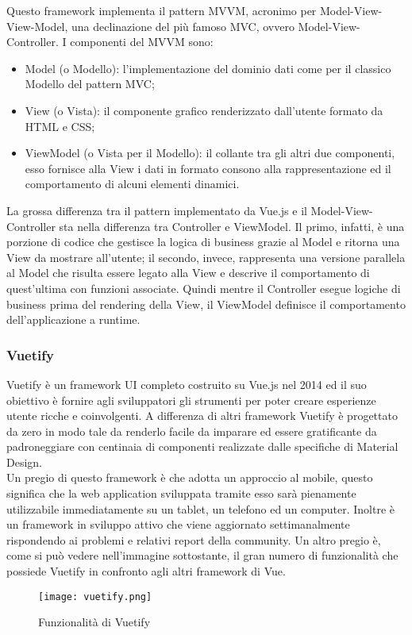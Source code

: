Questo framework implementa il pattern MVVM, acronimo per Model-View-View-Model, una declinazione del più famoso MVC, ovvero Model-View-Controller. I componenti del MVVM sono:
\begin{itemize}
	\item Model (o Modello): l'implementazione del dominio dati come per il classico Modello del pattern MVC;
	\item View (o Vista): il componente grafico renderizzato dall'utente formato da HTML e CSS;
	\item ViewModel (o Vista per il Modello): il collante tra gli altri due componenti, esso fornisce alla View i dati in formato consono alla rappresentazione ed il comportamento di alcuni elementi dinamici.
\end{itemize}
La grossa differenza tra il pattern implementato da Vue.js e il Model-View-Controller sta nella differenza tra Controller e ViewModel. Il primo, infatti, è una porzione di codice che gestisce la logica di business grazie al Model e ritorna una View da mostrare all'utente; il secondo, invece, rappresenta una versione parallela al Model che risulta essere legato alla View e descrive il comportamento di quest'ultima con funzioni associate. Quindi mentre il Controller esegue logiche di business prima del rendering della View, il ViewModel definisce il comportamento dell'applicazione a runtime.

\subsubsection{Vuetify}
Vuetify è un framework UI completo costruito su Vue.js nel 2014 ed il suo obiettivo è fornire agli sviluppatori gli strumenti per poter creare esperienze utente ricche e coinvolgenti. A differenza di altri framework Vuetify è progettato da zero in modo tale da renderlo facile da imparare ed essere gratificante da padroneggiare con centinaia di componenti realizzate dalle specifiche di Material Design.\\
Un pregio di questo framework è che adotta un approccio al mobile, questo significa che la web application sviluppata tramite esso sarà pienamente utilizzabile immediatamente su un tablet, un telefono ed un computer. Inoltre è un framework in sviluppo attivo che viene aggiornato settimanalmente rispondendo ai problemi e relativi report della community. Un altro pregio è, come si può vedere nell'immagine sottostante, il gran numero di funzionalità che possiede Vuetify in confronto agli altri framework di Vue.
\begin{figure}[H]
	\begin{center}
		\texttt{[image: vuetify.png]}
		\caption{Funzionalità di Vuetify}
	\end{center}
\end{figure}

